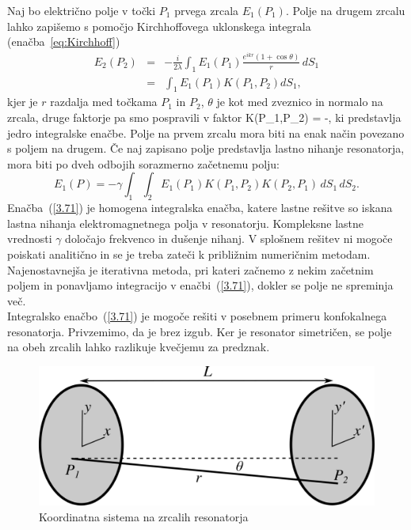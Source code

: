 \noindent
Naj bo električno polje v točki $P_{1}$ prvega zrcala $E_{1}(P_{1})$.
Polje na drugem zrcalu lahko zapišemo s pomočjo Kirchhoffovega uklonskega
integrala (enačba~\ref{eq:Kirchhoff})
\begin{eqnarray}
E_{2}(P_{2}) & = & -\frac{i}{2\lambda}\int_{1}E_{1}(P_{1})\frac{e^{ikr}(1+\cos\theta)}{r}\, dS_{1} \\
 & = & \int_{1}E_{1}(P_{1})K(P_{1},P_{2})dS_{1},
\label{eq:resuklon}
\end{eqnarray}
kjer je $r$ razdalja med točkama $P_{1}$ in $P_{2}$, $\theta$
je kot med zveznico in normalo na zrcala, druge faktorje pa smo pospravili v faktor
\beq
K(P_{1},P_{2}) = -,
\label{jedro}
\eeq
ki predstavlja jedro integralske enačbe. Polje na prvem zrcalu mora
biti na enak način povezano s poljem na drugem. Če naj zapisano polje predstavlja lastno nihanje
resonatorja, mora biti po dveh odbojih sorazmerno začetnemu polju:
\begin{equation}
E_{1}(P)=-\gamma\int_{1}\int_{2}E_{1}(P_{1})K(P_{1},P_{2})K(P_{2},P_1)\, dS_{1}\, dS_{2}.
\label{3.71}
\end{equation}
Enačba~(\ref{3.71}) je homogena integralska enačba, katere lastne
rešitve so iskana lastna nihanja elektromagnetnega polja v resonatorju.
Kompleksne lastne vrednosti $\gamma$ določajo frekvenco in dušenje
nihanj. V splošnem rešitev ni mogoče poiskati analitično in se je
treba zateči k približnim numeričnim metodam. Najenostavnejša je iterativna
metoda, pri kateri začnemo z nekim začetnim poljem in ponavljamo integracijo
v enačbi~(\ref{3.71}), dokler se polje ne spreminja več.\\

\noindent
Integralsko enačbo~(\ref{3.71}) je mogoče rešiti v posebnem primeru
konfokalnega resonatorja. Privzemimo, da je brez izgub. 
Ker je resonator simetričen, se polje na obeh zrcalih lahko razlikuje kvečjemu
za predznak.
\begin{figure}[h]
\centering
\includegraphics[width=7truecm]{slike/04_Uklon.png}
\caption{Koordinatna sistema na zrcalih resonatorja}
\label{fig:uklon_res_shema}
\end{figure}

